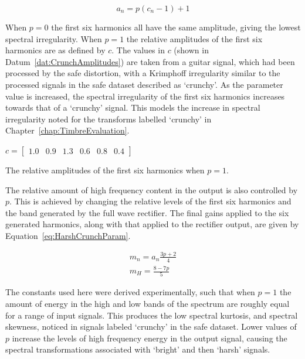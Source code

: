 			\begin{equation}
				a_{n} = p(c_{n} - 1) + 1
				\label{eq:HarshCrunchAmps}
			\end{equation}

			When $p = 0$ the first six harmonics all have the same amplitude, giving the lowest spectral
			irregularity. When $p = 1$ the relative amplitudes of the first six harmonics are as defined by
			$c$.  The values in $c$ (shown in Datum~\ref{dat:CrunchAmplitudes}) are taken from a guitar signal,
			which had been processed by the \acrshort{safe} distortion, with a Krimphoff irregularity similar
			to the processed signals in the \acrshort{safe} dataset described as `crunchy'. As the parameter
			value is increased, the spectral irregularity of the first six harmonics increases towards that of
			a `crunchy' signal.  This models the increase in spectral irregularity noted for the transforms
			labelled `crunchy' in Chapter~\ref{chap:TimbreEvaluation}.

			\begin{datum}[h!]
				\centering
				$c = \begin{bmatrix}
					1.0 & 0.9 & 1.3 & 0.6 & 0.8 & 0.4
				     \end{bmatrix}$
				\caption{The relative amplitudes of the first six harmonics when $p = 1$.}
				\label{dat:CrunchAmplitudes}
			\end{datum}
			
			The relative amount of high frequency content in the output is also controlled by $p$. This is
			achieved by changing the relative levels of the first six harmonics and the band generated by the
			full wave rectifier. The final gains applied to the six generated harmonics, along with that
			applied to the rectifier output, are given by Equation~\ref{eq:HarshCrunchParam}.

			\begin{gather}
				m_{n} = a_{n}\frac{3p + 2}{4} \nonumber \\
				m_{H} = \frac{8 - 7p}{5}
				\label{eq:HarshCrunchParam}
			\end{gather}

			The constants used here were derived experimentally, such that when $p = 1$ the amount of energy in
			the high and low bands of the spectrum are roughly equal for a range of input signals. This
			produces the low spectral kurtosis, and spectral skewness, noticed in signals labeled `crunchy' in
			the \acrshort{safe} dataset. Lower values of $p$ increase the levels of high frequency energy in
			the output signal, causing the spectral transformations associated with `bright' and then `harsh'
			signals.

